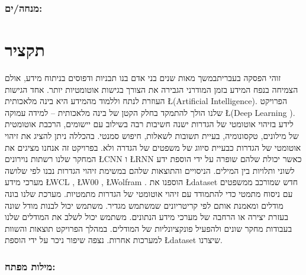 \documentclass[11pt]{article}
\begin{document}
\subsubsection*{מנחה/ים:}
\section*{תקציר}

זוהי הפסקה בעבריתבמשך מאות שנים בני אדם בנו תבניות ודפוסים בניתוח מידע, אולם הצמיחה בנפח המידע בזמן
המודרני הגבירה את הצורך בגישות אוטומטיות יותר. אחד הגישות העוזרת לנתח וללמוד מהמידע
היא בינה מלאכותית \L{(Artificial Intelligence)}. 
הפרויקט שלנו הולך להתמקד בחלק הקטן של
בינה מלאכותית – למידה עמוקה \L{(Deep Learning )}.
לידע בזיהוי אוטומטי של הגדרות ישנה חשיבות רבה בשילוב עם יישומים, הרכבת אוטומטית של
מילונים, טקסונומיה, בעיית תשובות לשאלות, חיפוש סמנטי. בהכללה ניתן להציג את זיהוי אוטומטי
של הגדרות כבעיית סיווג של משפטים של הגדרה ולא.
בפרויקט זה אנחנו מציגים את המחקר שלנו רשתות נוירונים \L{CNN} ו \L{RNN} כאשר יכולת שלהם
שופרה על ידי הוספת ידע לשוני ותלויות בין המילים. הניסויים והתוצאות שלהם במשימת זיהוי
הגדרות נבנו לפי שלושה מערכי מידע \L{WCL} , \L{W00} , \L{Wolfram} .
הוספנו את \L{dataset} חדש שמורכב ממשפטים עם ניסוח מתמטי כדי להתמודד עם זיהוי אוטומטי של
הגדרות מתמטיות.
מערכת שלנו בונה מודלים ומאמנת אותם לפי קריטריונים שמשתמש מגדיר. משתמש יכול לבנות
מודל שונה בעזרת יצירה או הרחבה של מערכי מידע הנתונים.
משתמש יכול לשלב את המודלים שלנו בעבודות מחקר שונים ולהפעיל פונקציונליות של המודלים.
במהלך הפרויקט תוצאות והשוות למערכות אחרות. נצפה שיפור ניכר על ידי הוספת \L{dataset}
שיצרנו.

\subsubsection*{מילות מפתח:}
\end{document}
